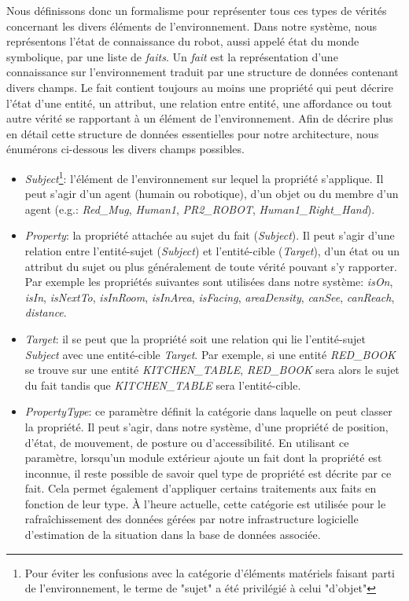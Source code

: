 \documentclass[a4paper,11pt,twoside]{StyleThese}
\begin{document}
Nous définissons donc un formalisme pour représenter tous ces types de vérités concernant les divers éléments de l'environnement.
Dans notre système, nous représentons l'état de connaissance du robot, aussi appelé état du monde symbolique, par une liste de \textit{faits}. Un \textit{fait} est la représentation d'une connaissance sur l'environnement traduit par une structure de données contenant divers champs. Le fait contient toujours au moins une propriété qui peut décrire l'état d'une entité, un attribut, une relation entre entité, une affordance ou tout autre vérité se rapportant à un élément de l'environnement.
Afin de décrire plus en détail cette structure de données essentielles pour notre architecture, nous énumérons ci-dessous les divers champs possibles. 

\begin{itemize}
\item \textit{Subject}\footnote{Pour éviter les confusions avec la catégorie d'éléments matériels faisant parti de l'environnement, le terme de "sujet" a été privilégié à celui "d'objet"}: l'élément de l'environnement sur lequel la propriété s'applique. Il peut s'agir d'un agent (humain ou robotique), d'un objet ou du membre d'un agent (e.g.: \textit{Red\_Mug}, \textit{Human1}, \textit{PR2\_ROBOT}, \textit{Human1\_Right\_Hand}).
\item \textit{Property}: la propriété attachée au sujet du fait (\textit{Subject}). Il peut s'agir d'une relation entre l'entité-sujet (\textit{Subject}) et l'entité-cible (\textit{Target}), d'un état ou un attribut du sujet ou plus généralement de toute vérité pouvant s'y rapporter.  Par exemple les propriétés suivantes sont utilisées dans notre système: \textit{isOn}, \textit{isIn}, \textit{isNextTo}, \textit{isInRoom}, \textit{isInArea}, \textit{isFacing}, \textit{areaDensity}, \textit{canSee}, \textit{canReach}, \textit{distance}.
\item \textit{Target}: il se peut que la propriété soit une relation qui lie l'entité-sujet \textit{Subject} avec une entité-cible \textit{Target}. Par exemple, si une entité \textit{RED\_BOOK} se trouve sur une entité \textit{KITCHEN\_TABLE}, \textit{RED\_BOOK} sera alors le sujet du fait tandis que \textit{KITCHEN\_TABLE} sera l'entité-cible.
\item \textit{PropertyType}: ce paramètre définit la catégorie dans laquelle on peut classer la propriété. Il peut s'agir, dans notre système, d'une propriété de position, d'état, de mouvement, de posture ou d'accessibilité. En utilisant ce paramètre, lorsqu'un module extérieur ajoute un fait dont la propriété est inconnue, il reste possible de savoir quel type de propriété est décrite par ce fait. Cela permet également d'appliquer certains traitements aux faits en fonction de leur type. À l'heure actuelle, cette catégorie est utilisée pour le rafraîchissement des données gérées par notre infrastructure logicielle d'estimation de la situation dans la base de données associée.

\end{itemize}
\end{document}
